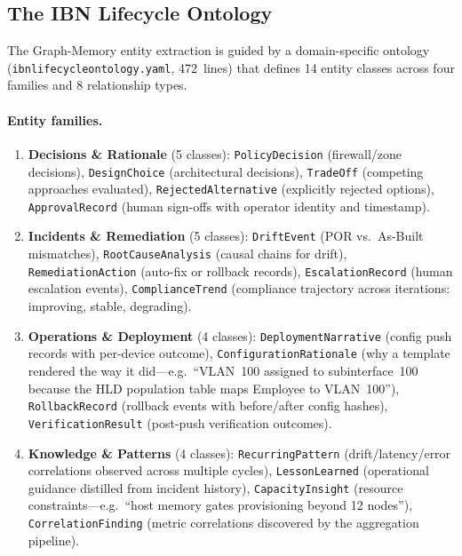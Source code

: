 \documentclass[acmtog]{acmart}
\renewcommand\_{\textunderscore\allowbreak}
\begin{document}
\subsection{The IBN Lifecycle Ontology}\label{sec:memory:ontology}

The Graph-Memory entity extraction is guided by a domain-specific
ontology (\texttt{ibn\_lifecycle\_ontology.yaml}, 472~lines) that
defines 14 entity classes across four families and 8 relationship
types.

\paragraph{Entity families.}

\begin{enumerate}
  \item \textbf{Decisions \& Rationale} (5 classes):
    \texttt{PolicyDecision} (firewall/zone decisions),
    \texttt{DesignChoice} (architectural decisions),
    \texttt{TradeOff} (competing approaches evaluated),
    \texttt{RejectedAlternative} (explicitly rejected options),
    \texttt{ApprovalRecord} (human sign-offs with operator identity
    and timestamp).

  \item \textbf{Incidents \& Remediation} (5 classes):
    \texttt{DriftEvent} (POR vs.\ As-Built mismatches),
    \texttt{RootCauseAnalysis} (causal chains for drift),
    \texttt{RemediationAction} (auto-fix or rollback records),
    \texttt{EscalationRecord} (human escalation events),
    \texttt{ComplianceTrend} (compliance trajectory across
    iterations: improving, stable, degrading).

  \item \textbf{Operations \& Deployment} (4 classes):
    \texttt{DeploymentNarrative} (config push records with
    per-device outcome),
    \texttt{ConfigurationRationale} (why a template rendered the
    way it did---e.g.\ ``VLAN~100 assigned to subinterface~100
    because the HLD population table maps Employee to VLAN~100''),
    \texttt{RollbackRecord} (rollback events with before/after
    config hashes),
    \texttt{VerificationResult} (post-push verification outcomes).

  \item \textbf{Knowledge \& Patterns} (4 classes):
    \texttt{RecurringPattern} (drift/latency/error correlations
    observed across multiple cycles),
    \texttt{LessonLearned} (operational guidance distilled from
    incident history),
    \texttt{CapacityInsight} (resource constraints---e.g.\ ``host
    memory gates provisioning beyond 12 nodes''),
    \texttt{CorrelationFinding} (metric correlations discovered
    by the aggregation pipeline).
\end{enumerate}
\end{document}

